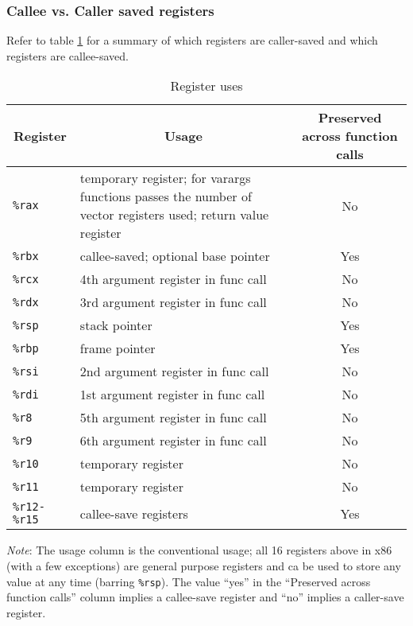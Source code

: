 \documentclass[11pt]{article}
\begin{document}
\subsubsection{Callee vs. Caller saved registers}

Refer to table \ref{table:register_use} for a summary of which registers are caller-saved
and which registers are callee-saved.

\begin{table}[h]
\begin{tabular}{ l | p{9cm} | c }
    \multicolumn{1}{c}{Register} & \multicolumn{1}{c}{Usage} &
    \multicolumn{1}{p{3cm}}{Preserved across function calls} \\\hline
    \texttt{\%rax} & temporary register; for varargs functions passes the number of vector
        registers used; return value register & No \\
    \texttt{\%rbx} & callee-saved; optional base pointer & Yes \\
    \texttt{\%rcx} & 4th argument register in func call & No \\
    \texttt{\%rdx} & 3rd argument register in func call & No \\
    \texttt{\%rsp} & stack pointer & Yes \\
    \texttt{\%rbp} & frame pointer & Yes \\
    \texttt{\%rsi} & 2nd argument register in func call & No \\
    \texttt{\%rdi} & 1st argument register in func call & No \\
    \texttt{\%r8}  & 5th argument register in func call & No \\
    \texttt{\%r9}  & 6th argument register in func call & No \\
    \texttt{\%r10} & temporary register & No \\
    \texttt{\%r11} & temporary register & No \\
    \texttt{\%r12-\%r15} & callee-save registers & Yes
\end{tabular}
\caption{Register uses}
\label{table:register_use}
\end{table}

\emph{Note}: The usage column is the conventional usage; all 16 registers above in x86
(with a few exceptions) are general purpose registers and ca be used to store any value at
any time (barring \texttt{\%rsp}). The value ``yes'' in the ``Preserved across function
calls'' column implies a callee-save register and ``no'' implies a caller-save register.
\end{document}
